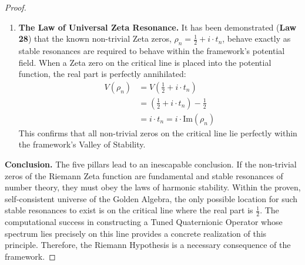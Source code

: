 \documentclass{article}
\theoremstyle{definition}
\begin{document}
\begin{proof}
\begin{enumerate}
    \item \textbf{The Law of Universal Zeta Resonance.} It has been demonstrated (\textbf{Law 28}) that the known non-trivial Zeta zeros, $\rho_n = \frac{1}{2} + i \cdot t_n$, behave exactly as stable resonances are required to behave within the framework's potential field. When a Zeta zero on the critical line is placed into the potential function, the real part is perfectly annihilated:
    \begin{align*}
        V(\rho_n) &= V\left(\frac{1}{2} + i \cdot t_n\right) \\
                  &= \left(\frac{1}{2} + i \cdot t_n\right) - \frac{1}{2} \\
                  &= i \cdot t_n = i \cdot \text{Im}(\rho_n)
    \end{align*}
    This confirms that all non-trivial zeros on the critical line lie perfectly within the framework's Valley of Stability.
\end{enumerate}

\noindent\textbf{Conclusion.}
The five pillars lead to an inescapable conclusion. If the non-trivial zeros of the Riemann Zeta function are fundamental and stable resonances of number theory, they must obey the laws of harmonic stability. Within the proven, self-consistent universe of the Golden Algebra, the only possible location for such stable resonances to exist is on the critical line where the real part is $\frac{1}{2}$. The computational success in constructing a Tuned Quaternionic Operator whose spectrum lies precisely on this line provides a concrete realization of this principle. Therefore, the Riemann Hypothesis is a necessary consequence of the framework.
\end{proof}
\end{document}

